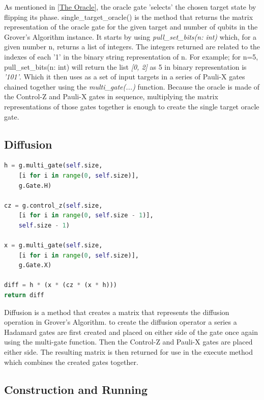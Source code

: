 \documentclass{article}
\begin{document}
As mentioned in \ref{The Oracle}, the oracle gate 'selects' the chosen target state by flipping its phase. single\_target\_oracle() is the method that returns the matrix representation of the oracle gate for the given target and number of qubits in the Grover's Algorithm instance. It starts by using \textit{pull\_set\_bits(n: int)} which, for a given number n, returns a list of integers. The integers returned are related to the indexes of each '1' in the binary string representation of n. For example; for n=5, pull\_set\_bits(n: int) will return the list \textit{[0, 2]} as 5 in binary representation is \textit{'101'}. Which it then uses as a set of input targets in a series of Pauli-X gates chained together using the \textit{multi\_gate(...)} function. Because the oracle is made of the Control-Z and Pauli-X gates in sequence, multiplying the matrix representations of those gates together is enough to create the single target oracle gate.

\subsection{Diffusion}

\begin{file}
\begin{lstlisting}[language=Python]
h = g.multi_gate(self.size, 
	[i for i in range(0, self.size)], 
	g.Gate.H)
			
cz = g.control_z(self.size, 
	[i for i in range(0, self.size - 1)], 
	self.size - 1)
			
x = g.multi_gate(self.size, 
	[i for i in range(0, self.size)], 
	g.Gate.X)
			
diff = h * (x * (cz * (x * h)))
return diff

\end{lstlisting}
\end{file}


Diffusion is a method that creates a matrix that represents the diffusion operation in Grover's Algorithm. to create the diffusion operator a series a Hadamard gates are first created and placed on either side of the gate once again using the multi-gate function. Then the Control-Z and Pauli-X gates are placed either side. The resulting matrix is then returned for use in the execute method which combines the created gates together.

\subsection{Construction and Running}
\end{document}
